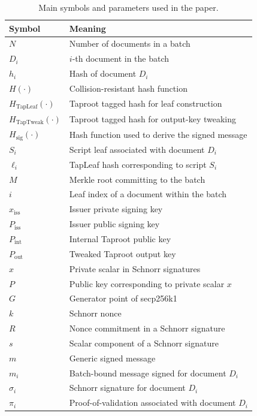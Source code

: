 \documentclass{IEEEoj}
\begin{document}
\begin{table}[!t]
\centering
\caption{Main symbols and parameters used in the paper.}
\label{tab:notation}
\small
\renewcommand{\arraystretch}{1.15}
\begin{tabular}{ll}
\hline
\textbf{Symbol} & \textbf{Meaning} \\
\hline
$N$ & Number of documents in a batch \\
$D_i$ & $i$-th document in the batch \\
$h_i$ & Hash of document $D_i$ \\
$H(\cdot)$ & Collision-resistant hash function \\
$H_{\text{TapLeaf}}(\cdot)$ & Taproot tagged hash for leaf construction \\
$H_{\text{TapTweak}}(\cdot)$ & Taproot tagged hash for output-key tweaking \\
$H_{\mathrm{sig}}(\cdot)$ & Hash function used to derive the signed message \\
$S_i$ & Script leaf associated with document $D_i$ \\
$\ell_i$ & TapLeaf hash corresponding to script $S_i$ \\
$M$ & Merkle root committing to the batch \\
$i$ & Leaf index of a document within the batch \\
$x_{\mathrm{iss}}$ & Issuer private signing key \\
$P_{\mathrm{iss}}$ & Issuer public signing key \\
$P_{\mathrm{int}}$ & Internal Taproot public key \\
$P_{\mathrm{out}}$ & Tweaked Taproot output key \\
$x$ & Private scalar in Schnorr signatures \\
$P$ & Public key corresponding to private scalar $x$ \\
$G$ & Generator point of secp256k1 \\
$k$ & Schnorr nonce \\
$R$ & Nonce commitment in a Schnorr signature \\
$s$ & Scalar component of a Schnorr signature \\
$m$ & Generic signed message \\
$m_i$ & Batch-bound message signed for document $D_i$ \\
$\sigma_i$ & Schnorr signature for document $D_i$ \\
$\pi_i$ & Proof-of-validation associated with document $D_i$ \\

\end{tabular}
\end{table}
\end{document}
